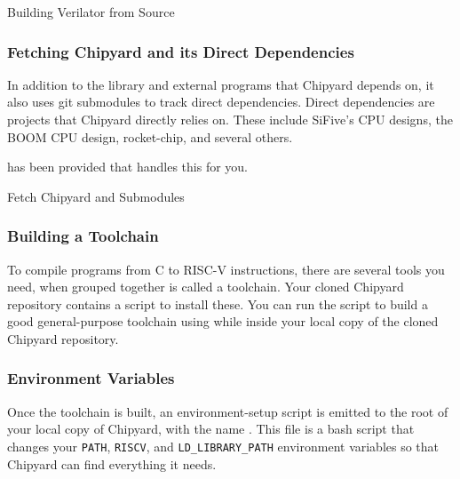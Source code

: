 \begin{listing}[h!tbp]
\caption{Building Verilator from Source}
\label{lst:Build_Verilator_from_Source}
\end{listing}

\subsubsection{Fetching Chipyard and its Direct Dependencies}\label{sec:Fetching_Chipyard_Direct_Dependencies}
In addition to the library and external programs that Chipyard depends on, it also uses git submodules to track direct dependencies.
Direct dependencies are projects that Chipyard directly relies on.
These include SiFive's CPU designs, the BOOM CPU design, rocket-chip, and several others.

 has been provided that handles this for you.

\begin{listing}[h!tbp]
\caption{Fetch Chipyard and Submodules}
\label{lst:Fetch_Chipyard_and_Submodules}
\end{listing}

\subsubsection{Building a Toolchain}\label{sec:Building_Toolchain}
To compile programs from C to RISC-V instructions, there are several tools you need, when grouped together is called a toolchain.
Your cloned Chipyard repository contains a script to install these.
You can run the script to build a good general-purpose toolchain using  while inside your local copy of the cloned Chipyard repository.

\subsubsection{Environment Variables}\label{sec:Environment_Variables}
Once the toolchain is built, an environment-setup script is emitted to the root of your local copy of Chipyard, with the name .
This file is a bash script that changes your \texttt{PATH}, \texttt{RISCV}, and \texttt{LD\_LIBRARY\_PATH} environment variables so that Chipyard can find everything it needs.

